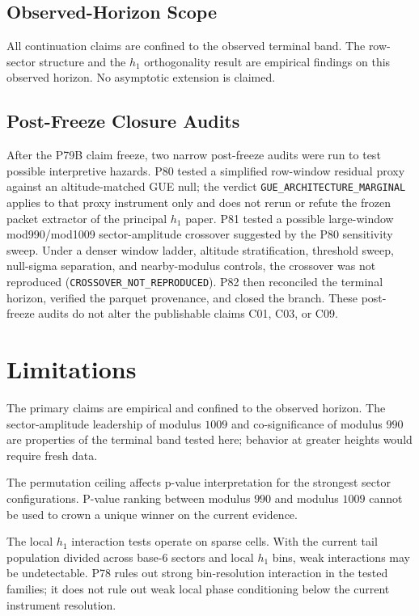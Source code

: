 \documentclass[11pt]{article}
\begin{document}
\subsection{Observed-Horizon Scope}

All continuation claims are confined to the observed terminal band.
The row-sector structure and the $h_1$ orthogonality result are
empirical findings on this observed horizon. No asymptotic extension is
claimed.

\subsection{Post-Freeze Closure Audits}

After the P79B claim freeze, two narrow post-freeze audits were run to
test possible interpretive hazards. P80 tested a simplified
row-window residual proxy against an altitude-matched GUE null; the
verdict \texttt{GUE\_ARCHITECTURE\_MARGINAL} applies to that proxy
instrument only and does not rerun or refute the frozen packet extractor
of the principal $h_1$ paper. P81 tested a possible large-window
mod990/mod1009 sector-amplitude crossover suggested by the P80
sensitivity sweep. Under a denser window ladder, altitude
stratification, threshold sweep, null-sigma separation, and
nearby-modulus controls, the crossover was not reproduced
(\texttt{CROSSOVER\_NOT\_REPRODUCED}). P82 then reconciled the
terminal horizon, verified the parquet provenance, and closed the
branch. These post-freeze audits do not alter the publishable claims
C01, C03, or C09.

\section{Limitations}

The primary claims are empirical and confined to the observed horizon.
The sector-amplitude leadership of modulus $1009$ and co-significance
of modulus $990$ are properties of the terminal band tested here;
behavior at greater heights would require fresh data.

The permutation ceiling affects p-value interpretation for the strongest
sector configurations. P-value ranking between modulus $990$ and
modulus $1009$ cannot be used to crown a unique winner on the current
evidence.

The local $h_1$ interaction tests operate on sparse cells. With the
current tail population divided across base-6 sectors and local $h_1$
bins, weak interactions may be undetectable. P78 rules out strong
bin-resolution interaction in the tested families; it does not rule out
weak local phase conditioning below the current instrument resolution.
\end{document}
